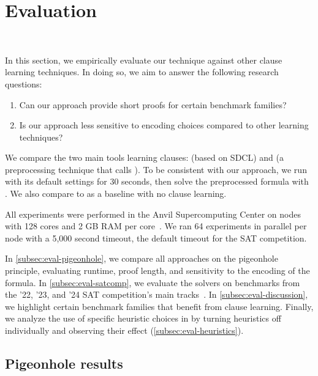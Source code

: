 \section{Evaluation}~\label{sec:evaluation}

In this section, we empirically evaluate our technique against other \pr clause
learning techniques. In doing so, we aim to answer the following research
questions:


\begin{enumerate}
    \item Can our approach provide short \pr proofs for certain benchmark
    families?
    \item Is our approach less sensitive to encoding choices compared to other
    \pr learning techniques?
\end{enumerate}


We compare the two main tools learning \pr clauses: \sadical (based on SDCL) and
\prelearn (a preprocessing technique that calls \sadical). To be consistent with
our approach, we run \prelearn with its default settings for 30 seconds, then solve the preprocessed formula with \cadical. We also
compare to \cadical as a baseline with no \pr clause learning.

All experiments were performed in the Anvil Supercomputing Center on nodes with
128 cores and 2 GB RAM per core~\cite{anvil}. We ran 64 experiments in parallel
per node with a 5,000 second timeout, the default timeout for the SAT
competition.

In \autoref{subsec:eval-pigeonhole}, we compare all approaches on the pigeonhole
principle, evaluating runtime, proof length, and sensitivity to the encoding of
the formula. In \autoref{subsec:eval-satcomp}, we evaluate the solvers on
benchmarks from the '22, '23, and '24 SAT competition's main
tracks~\cite{satcomp2022,satcomp2023,satcomp2024}. In
\autoref{subsec:eval-discussion}, we highlight certain benchmark families that
benefit from \pr clause learning.
Finally, we analyze the use of specific heuristic choices in \tool by turning
heuristics off individually and observing their effect
(\autoref{subsec:eval-heuristics}). 



\subsection{Pigeonhole results}~\label{subsec:eval-pigeonhole}

